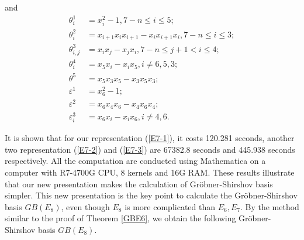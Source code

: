 \documentclass[UTF8]{amsart}
\theoremstyle{definition}
\theoremstyle{remark}
\numberwithin{equation}{section}
\begin{document}
and
\begin{equation}\label{E7-3}
\begin{aligned}
	\theta_i^1&=x_i^2-1 ,7-n\leq i\leq 5;\\
	\theta_i^2&=x_{i+1}x_ix_{i+1}-x_ix_{i+1}x_i ,7-n\leq i\leq 3;\\
	\theta_{i,j}^3&=x_ix_j-x_jx_i ,7-n\leq j+1<i\leq 4;\\
	\theta_i^4&=x_{5}x_i-x_ix_{5},i\ne 6,5,3;\\
	\theta^5&=x_{5}x_{3}x_{5}-x_{3}x_{5}x_{3};\\
	\varepsilon^1&=x_6^2-1 ;\\
	\varepsilon^2&=x_6x_{4}x_6-x_{4}x_6x_{4};\\
	\varepsilon_i^3&=x_6x_i-x_ix_6,i\ne 4,6.
\end{aligned}
\end{equation}



It is shown that for our representation (\ref{E7-1}),  it costs 120.281 seconds, another two representation (\ref{E7-2}) and (\ref{E7-3}) are 67382.8 seconds and 445.938 seconds respectively. All the computation are conducted using Mathematica on a computer with R7-4700G CPU, 8 kernels and 16G RAM.  These results illustrate that our new presentation makes the calculation of Gr\"{o}bner-Shirshov basis simpler. This new presentation is the key point to calculate the Gr\"{o}bner-Shirshov basis $GB(E_8)$, even though $E_8$ is more complicated than $E_6, E_7$. By the method  similar to the proof of Theorem \ref{GBE6}, we obtain the following Gr\"{o}bner-Shirshov basis $GB(E_8)$.
\end{document}
